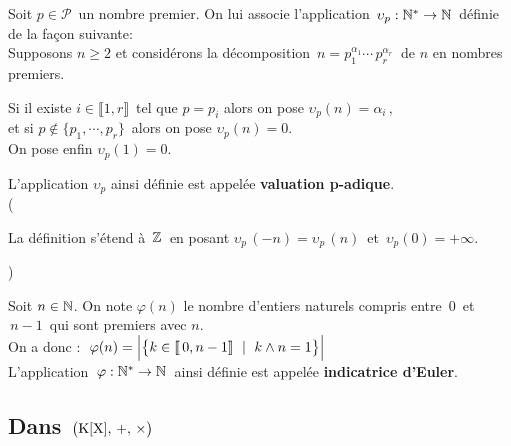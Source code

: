 \vspace{1cm}

\noindent Soit $p\in \mathcal{P}\,$ un nombre premier. On lui associe l'application \(\,\upsilon_p :\mathbb{N}^* \to \mathbb{N}\,\) définie de la façon suivante:\vspace{0.2cm}\\
Supposons $n\geq 2$ et considérons la décomposition \(\,n=p_1^{\alpha_1}\cdots\, p_r^{\alpha_r}\:\) de $n$ en nombres premiers.\vspace{-0.2cm}
\begin{center}
Si il existe \(i\in \llbracket 1,r \rrbracket\,\) tel que $p=p_i$ alors on pose $\upsilon_p(n)=\alpha_i\,,$\vspace{0.1cm}\\
et si \(p\notin \{p_1,\cdots,p_r\}\,\) alors on pose $\upsilon_p(n)=0.$\vspace{0.1cm}\\
On pose enfin $\upsilon_p(1)=0.$
\end{center}
L'application $\upsilon_p$ ainsi définie est appelée \textbf{valuation p-adique}.\vspace{0.1cm}\\
(\begin{small}
    La définition s'étend à $\,\mathbb{Z}\,$ en posant $\upsilon_p\,(-n)=\upsilon_p\,(n)\,$ et $\,\upsilon_p(0)=+\infty$.
\end{small})

\vspace{1cm}

Soit $n\in \mathbb{N}$\expo{*}. On note $\varphi(n)$ le nombre d'entiers naturels compris entre $\,0\,$ et $\,n-1\,$ qui sont premiers avec $n$.\\
On a donc : \(\; \displaystyle \varphi(n)=\Bigl| \bigl\{k\in \llbracket \,0,n-1\rrbracket \ \mid \ k\land n =1\bigr\} \Bigr|\)\vspace{0.1cm}\\
L'application \(\:\varphi : \mathbb{N}^* \to \mathbb{N}\:\) ainsi définie est appelée \textbf{indicatrice d'Euler}.

\vspace{1.5cm}

\subsection{Dans $\,\bigl(\text{K}[\text{X}],\,+,\,\times \bigr)$}

\vspace{0.5cm}

